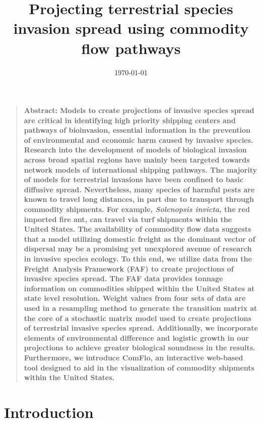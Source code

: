 \documentclass[12pt]{article}
\title{Projecting terrestrial species invasion spread using commodity flow pathways}
\author
{Ashish Gauli,$^{1,2}$ Nathan Wikle,$^{1,3}$ Ryan Yan,$^{1,4}$\\ 
Dr. Louis Gross,$^{1,5}$ Dr. Daniel Simberloff,$^{5}$ Angela Chuang,$^{5}$ Cedric Landerer$^{5}$\\
\\
\normalsize{$^{1}$National Institute for Mathematical and Biological Synthesis (NIMBioS)}\\
\normalsize{$^{2}$Biology and Computer Science, Fisk University}\\
\normalsize{$^{3}$Mathematics, Truman State University}\\
\normalsize{$^{4}$Mathematical Biology, College of William and Mary}\\
\normalsize{$^{5}$Ecology and Evolutionary Biology, University of Tennessee}\\
\\
}
\date{\today}
\newenvironment{sciabstract}{%
\begin{quote} \bf}
{\end{quote}}
\begin{document}
 


\baselineskip24pt


\maketitle 


 \begin{sciabstract}
Abstract: Models to create projections of invasive species spread are critical in identifying high priority shipping centers and pathways of bioinvasion, essential information in the prevention of environmental and economic harm caused by invasive species. Research into the development of models of biological invasion across broad spatial regions have mainly been targeted towards network models of international shipping pathways. The majority of models for terrestrial invasions have been confined to basic diffusive spread. Nevertheless, many species of harmful pests are known to travel long distances, in part due to transport through commodity shipments. For example, \textit{Solenopsis invicta}, the red imported fire ant, can travel via turf shipments within the United States. The availability of commodity flow data suggests that a model utilizing domestic freight as the dominant vector of dispersal may be a promising yet unexplored avenue of research in invasive species ecology. To this end, we utilize data from the Freight Analysis Framework (FAF) to create projections of invasive species spread. The FAF data provides tonnage information on commodities shipped within the United States at state level resolution. Weight values from four sets of data are used in a resampling method to generate the transition matrix at the core of a stochastic matrix model used to create projections of terrestrial invasive species spread. Additionally, we incorporate elements of environmental difference and logistic growth in our projections to achieve greater biological soundness in the results. Furthermore, we introduce ComFlo, an interactive web-based tool designed to aid in the visualization of commodity shipments within the United States.
\end{sciabstract}



\section*{Introduction}
\end{document}
